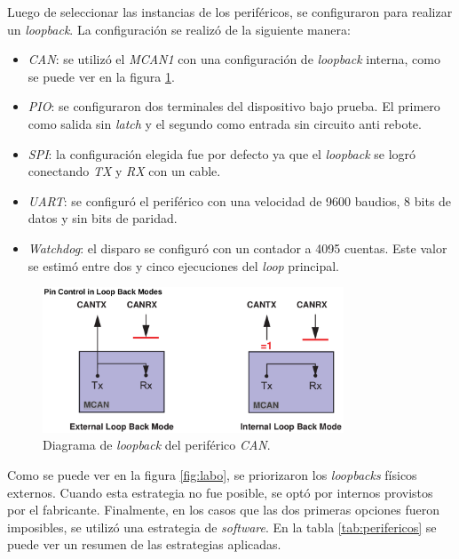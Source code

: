 Luego de seleccionar las instancias de los periféricos, se configuraron para realizar un \emph{loopback}.
La configuración se realizó de la siguiente manera:

\begin{itemize}
    \item \emph{CAN}: se utilizó el \emph{MCAN1} con una configuración de \emph{loopback} interna, como se puede ver en la figura \ref{fig:canloopback}.
    \item \emph{PIO}: se configuraron dos terminales del dispositivo bajo prueba.
        El primero como salida sin \emph{latch} y el segundo como entrada sin circuito anti rebote.
    \item \emph{SPI}: la configuración elegida fue por defecto ya que el \emph{loopback} se logró conectando \emph{TX} y \emph{RX} con un cable.
    \item \emph{UART}: se configuró el periférico con una velocidad de 9600 baudios, 8 bits de datos y sin bits de paridad.
    \item \emph{Watchdog}: el disparo se configuró con un contador a 4095 cuentas.
        Este valor se estimó entre dos y cinco ejecuciones del \emph{loop} principal.
\end{itemize}

\begin{figure}[htbp]
	\centering
	\includegraphics[width=0.8\textwidth]{./Figures/canloopback.png}
    \caption{Diagrama de \emph{loopback} del periférico \emph{CAN}\protect\footnotemark.}
	\label{fig:canloopback}
\end{figure}


Como se puede ver en la figura \ref{fig:labo}, se priorizaron los \emph{loopbacks} físicos externos.
Cuando esta estrategia no fue posible, se optó por internos provistos por el fabricante.
Finalmente, en los casos que las dos primeras opciones fueron imposibles, se utilizó una estrategia de \emph{software}.
En la tabla \ref{tab:perifericos} se puede ver un resumen de las estrategias aplicadas.

